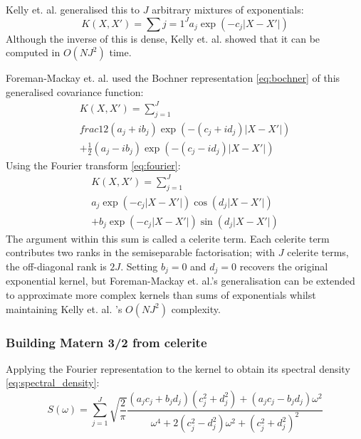Kelly et. al. \cite{general-exp} generalised this to $J$ arbitrary mixtures of exponentials:
\begin{equation*}
    K(X, X') = \sum{j=1}^J a_j \exp(-c_j |X - X'|)
\end{equation*}
Although the inverse of this is dense, Kelly et. al. \cite{general-exp} showed that it can be computed in $O(N J^2)$ time.

Foreman-Mackay et. al. \cite{foreman-mackay} used the Bochner representation \ref{eq:bochner} of this generalised covariance function: %
\begin{equation*}
    \begin{aligned}
        K(X, X') = \sum_{j=1}^J \\
        frac{1}{2} (a_j + i b_j) \exp(-(c_j + i d_j) |X - X'|) \\
        + \frac{1}{2} (a_j - i b_j) \exp(-(c_j - i d_j) |X - X'|)
    \end{aligned}
\end{equation*}
Using the Fourier transform \ref{eq:fourier}:
\begin{equation} \label{eq:celerite}
    \begin{aligned}
        K(X, X') = \sum_{j=1}^J \\
        a_j \exp(-c_j |X - X'|) \cos(d_j |X - X'|) \\ 
        + b_j \exp(-c_j |X - X'|) \sin(d_j |X - X'|)
    \end{aligned}
\end{equation}
The argument within this sum is called a celerite term. Each celerite term contributes two ranks in the semiseparable factorisation; with $J$ celerite terms, the off-diagonal rank is $2J$. Setting $b_j = 0$ and $d_j = 0$ recovers the original exponential kernel, but Foreman-Mackay et. al.'s \cite{foreman-mackay} generalisation can be extended to approximate more complex kernels than sums of exponentials whilst maintaining Kelly et. al. \cite{general-exp}'s $O(N J^2)$ complexity.

\subsubsection{Building Matern 3/2 from celerite}
Applying the Fourier representation to the kernel to obtain its spectral density \ref{eq:spectral_density}:
\begin{equation*}
    S(\omega) = \sum_{j=1}^J \sqrt{\frac{2}{\pi}} \frac{(a_j c_j + b_j d_j) (c_j^2 + d_j^2) + (a_j c_j - b_j d_j) \omega^2}{\omega^4 + 2(c_j^2 - d_j^2) \omega^2 + (c_j^2 + d_j^2)^2}
\end{equation*}

